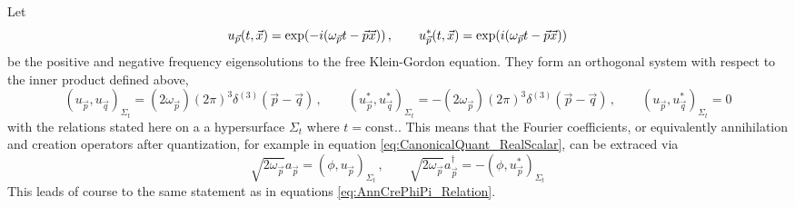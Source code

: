 Let 
\begin{equation}
    u_{\vec{p}}(t,\vec{x})=\exp(-{i}(\omega_{\vec{p}}t-\vec{p}\vec{x}))\,,\qquad u_{\vec{p}}^*(t,\vec{x})=\exp({i}(\omega_{\vec{p}}t-\vec{p}\vec{x}))
\end{equation}
be the positive and negative frequency eigensolutions to the free Klein-Gordon equation. They form an orthogonal system with respect to the inner product defined above,
\begin{equation}
    (u_{\vec{p}},u_{\vec{q}})_{\Sigma_t}=(2\omega_{\vec{p}})(2\pi)^3\delta^{(3)}(\vec{p}-\vec{q})\,,\qquad (u_{\vec{p}}^*,u_{\vec{q}}^*)_{\Sigma_t}=-(2\omega_{\vec{p}})(2\pi)^3\delta^{(3)}(\vec{p}-\vec{q})\,,\qquad (u_{\vec{p}},u_{\vec{q}}^*)_{\Sigma_t}=0
\end{equation}
with the relations stated here on a a hypersurface $\Sigma_t$ where $t=\text{const.}$. This means that the Fourier coefficients, or equivalently annihilation and creation operators after quantization, for example in equation \eqref{eq:CanonicalQuant_RealScalar}, can be extraced via
\begin{equation}
    \sqrt{2\omega_{\vec{p}}}a_{\vec{p}}=(\phi,u_{\vec{p}})_{\Sigma_t}\,,\qquad \sqrt{2\omega_{\vec{p}}}a_{\vec{p}}^\dagger=-(\phi,u_{\vec{p}}^*)_{\Sigma_t}
\end{equation}
This leads of course to the same statement as in equations \eqref{eq:AnnCrePhiPi_Relation}.


